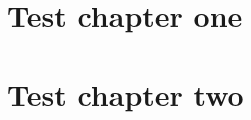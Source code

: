 \documentclass{article}
\begin{document}
\getargsC{\mypagenum}

\section{Test chapter one}
\lipsum[1-8]
\section{Test chapter two}
\lipsum[1-8]
\end{document}
